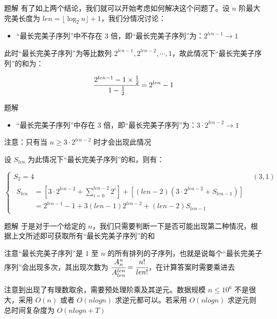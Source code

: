 \documentclass{pptt}
\begin{document}
\begin{frame}{题解}
    有了如上两个结论，我们就可以开始考虑如何解决这个问题了。设 $n$ 阶最大完美长度为 $len=\lfloor \log_2 n \rfloor + 1$，我们分情况讨论：

    \begin{itemize} \item “最长完美子序列”中不存在 $3$ 倍，即“最长完美子序列”为：$2^{len-1} \rightarrow 1$ \end{itemize}

    此时“最长完美子序列”为等比数列 $2^{len-1},2^{len-2},\cdots,1$，故此情况下“最长完美子序列”的和为：

    $$
        \cfrac{2^{len-1}-1 \times \frac{1}{2}}{1-\frac{1}{2}}=2^{len}-1
    $$
\end{frame}

\begin{frame}{题解}
    \begin{itemize} \item “最长完美子序列”中存在 $3$ 倍，即“最长完美子序列”为：$3 \cdot 2^{len-2} \rightarrow 1$ \end{itemize}

    注意：只有当 $n \geq 3 \cdot 2^{len-2}$ 时才会出现此情况

    设 $S_{len}$ 为此情况下“最长完美子序列”的和，则有：

    $$
        \begin{cases}
            S_2 = 4 & (3,1) \\
            \begin{aligned}
                S_{len} & = \left[ 3 \cdot 2^{len-2} + \sum_{i=0}^{len-2} 2^{i} \right] + \left[ (len-2)(3 \cdot 2^{len-2} + S_{len-1}) \right] \\
                        & = 2^{len-1}-1 + 3(len-1)2^{len-2} + (len-2)S_{len-1}
            \end{aligned}
        \end{cases}
    $$
\end{frame}

\begin{frame}{题解}
    于是对于一个给定的 $n$，我们只需要判断一下是否可能出现第二种情况，根据上文所述即可获取所有“最长完美子序列”的和

    注意“最长完美子序列”是 $1$ 至 $n$ 的所有排列的子序列，也就是说每个“最长完美子序列”会出现多次，其出现次数为 $\cfrac{A_n^n}{A_{len}^{len}}=\cfrac{n!}{len!}$，在计算答案时需要乘进去

    注意到出现了有理数取余，需要预处理阶乘及其逆元。数据规模 $n \leq {10}^6$ 不是很大，采用 $O(n)$ 或者 $O(nlogn)$ 求逆元都可以。若采用 $O(nlogn)$ 求逆元则总时间复杂度为 $O(nlogn+T)$
\end{frame}
\end{document}
